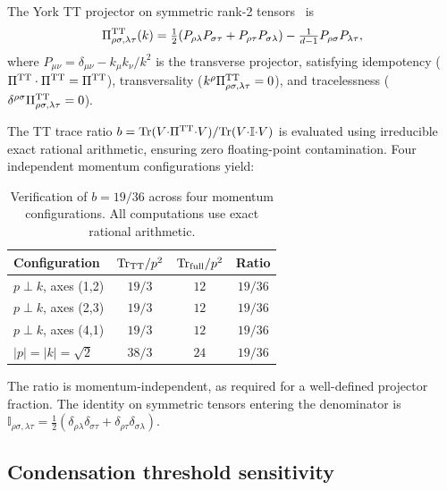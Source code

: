 \documentclass[a4paper,fleqn]{cas-dc}
\begin{document}
The York TT projector on symmetric rank-2
tensors~\cite{york1973} is
\begin{equation}
\Pi^{\rm TT}_{\rho\sigma,\lambda\tau}(k) =
  \tfrac{1}{2}(P_{\rho\lambda}P_{\sigma\tau}
  + P_{\rho\tau}P_{\sigma\lambda})
  - \tfrac{1}{d{-}1}P_{\rho\sigma}P_{\lambda\tau},
\label{eq:projector}
\end{equation}
where $P_{\mu\nu} = \delta_{\mu\nu} - k_\mu k_\nu/k^2$ is the
transverse projector, satisfying idempotency
($\Pi^{\rm TT}\cdot\Pi^{\rm TT} = \Pi^{\rm TT}$), transversality
($k^\rho\Pi^{\rm TT}_{\rho\sigma,\lambda\tau} = 0$), and
tracelessness
($\delta^{\rho\sigma}\Pi^{\rm TT}_{\rho\sigma,\lambda\tau} = 0$).

The TT trace ratio
$b = {\rm Tr}(V{\cdot}\Pi^{\rm TT}{\cdot}V)/
     {\rm Tr}(V{\cdot}\mathbb{I}{\cdot}V)$
is evaluated using irreducible exact rational arithmetic, ensuring
zero floating-point contamination. Four independent momentum
configurations yield:

\begin{table}[pos=!htbp]
\caption{Verification of $b = 19/36$ across four momentum
  configurations. All computations use exact rational arithmetic.}
\label{tab:b_verification}
\begin{tabular}{lccc}
Configuration & ${\rm Tr}_{\rm TT}/p^2$ &
  ${\rm Tr}_{\rm full}/p^2$ & Ratio \\
\hline
$p \perp k$, axes (1,2) & $19/3$ & $12$ & $19/36$ \\
$p \perp k$, axes (2,3) & $19/3$ & $12$ & $19/36$ \\
$p \perp k$, axes (4,1) & $19/3$ & $12$ & $19/36$ \\
$|p|{=}|k|{=}\sqrt{2}$  & $38/3$ & $24$ & $19/36$ \\
\end{tabular}
\end{table}

\noindent
The ratio is momentum-independent, as required for a well-defined
projector fraction. The identity on symmetric tensors entering the
denominator is
$\mathbb{I}_{\rho\sigma,\lambda\tau} =
  \frac{1}{2}(\delta_{\rho\lambda}\delta_{\sigma\tau}
  + \delta_{\rho\tau}\delta_{\sigma\lambda})$.

\subsection{Condensation threshold sensitivity}
\label{app:ztrans_sensitivity}
\end{document}
